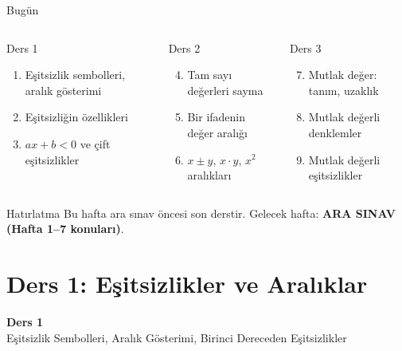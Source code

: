 \documentclass[aspectratio=169,11pt]{beamer}
\begin{document}
\begin{frame}{Bugün}
\begin{columns}[t]
\begin{block}{Ders 1}
\begin{enumerate}
\item Eşitsizlik sembolleri, aralık gösterimi
\item Eşitsizliğin özellikleri
\item \(ax+b<0\) ve çift eşitsizlikler
\end{enumerate}
\end{block}
\begin{block}{Ders 2}
\begin{enumerate}\setcounter{enumi}{3}
\item Tam sayı değerleri sayma
\item Bir ifadenin değer aralığı
\item \(x\pm y\), \(x\cdot y\), \(x^2\) aralıkları
\end{enumerate}
\end{block}
\begin{block}{Ders 3}
\begin{enumerate}\setcounter{enumi}{6}
\item Mutlak değer: tanım, uzaklık
\item Mutlak değerli denklemler
\item Mutlak değerli eşitsizlikler
\end{enumerate}
\end{block}
\end{columns}
\vspace{6pt}
\begin{alertblock}{Hatırlatma}
Bu hafta ara sınav öncesi son derstir. Gelecek hafta: \textbf{ARA SINAV (Hafta 1--7 konuları)}.
\end{alertblock}
\end{frame}

\section{Ders 1: Eşitsizlikler ve Aralıklar}
\begin{frame}
\centering\Large\color{anamavi}\textbf{Ders 1}\\[6pt]\normalsize Eşitsizlik Sembolleri, Aralık Gösterimi, Birinci Dereceden Eşitsizlikler
\end{frame}
\end{document}
